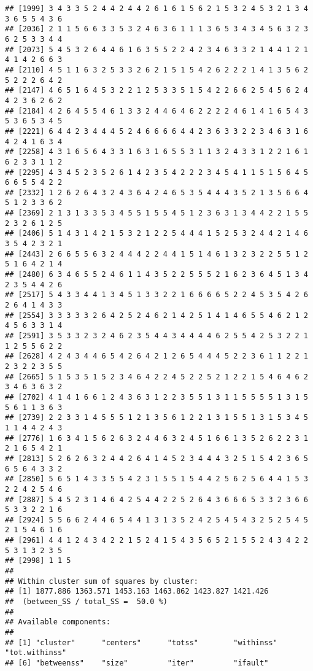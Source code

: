 \documentclass[
]{article}
\begin{document}
\begin{verbatim}
## [1999] 3 4 3 3 5 2 4 4 2 4 4 2 6 1 6 1 5 6 2 1 5 3 2 4 5 3 2 1 3 4 3 6 5 5 4 3 6
## [2036] 2 1 1 5 6 6 3 3 5 3 2 4 6 3 6 1 1 1 3 6 5 3 4 3 4 5 6 3 2 3 6 2 5 3 3 4 4
## [2073] 5 4 5 3 2 6 4 4 6 1 6 3 5 5 2 2 4 2 3 4 6 3 3 2 1 4 4 1 2 1 4 1 4 2 6 6 3
## [2110] 4 5 1 1 6 3 2 5 3 3 2 6 2 1 5 1 5 4 2 6 2 2 2 1 4 1 3 5 6 2 5 2 2 2 6 4 2
## [2147] 4 6 5 1 6 4 5 3 2 2 1 2 5 3 3 5 1 5 4 2 2 6 6 2 5 4 5 6 2 4 4 2 3 6 2 6 2
## [2184] 4 2 6 4 5 5 4 6 1 3 3 2 4 4 6 4 6 2 2 2 2 4 6 1 4 1 6 5 4 3 5 3 6 5 3 4 5
## [2221] 6 4 4 2 3 4 4 4 5 2 4 6 6 6 6 4 4 2 3 6 3 3 2 2 3 4 6 3 1 6 4 2 4 1 6 3 4
## [2258] 4 3 1 6 5 6 4 3 3 1 6 3 1 6 5 5 3 1 1 3 2 4 3 3 1 2 2 1 6 1 6 2 3 3 1 1 2
## [2295] 4 3 4 5 2 3 5 2 6 1 4 2 3 5 4 2 2 2 3 4 5 4 1 1 5 1 5 6 4 5 6 6 5 5 4 2 2
## [2332] 1 2 6 2 6 4 3 2 4 3 6 4 2 4 6 5 3 5 4 4 4 3 5 2 1 3 5 6 6 4 5 1 2 3 3 6 2
## [2369] 2 1 3 1 3 3 5 3 4 5 5 1 5 5 4 5 1 2 3 6 3 1 3 4 4 2 2 1 5 5 2 3 2 6 1 2 5
## [2406] 5 1 4 3 1 4 2 1 5 3 2 1 2 2 5 4 4 4 1 5 2 5 3 2 4 4 2 1 4 6 3 5 4 2 3 2 1
## [2443] 2 6 6 5 5 6 3 2 4 4 4 2 2 4 4 1 5 1 4 6 1 3 2 3 2 2 5 5 1 2 5 1 6 4 2 1 4
## [2480] 6 3 4 6 5 5 2 4 6 1 1 4 3 5 2 2 5 5 5 2 1 6 2 3 6 4 5 1 3 4 2 3 5 4 4 2 6
## [2517] 5 4 3 3 4 4 1 3 4 5 1 3 3 2 2 1 6 6 6 6 5 2 2 4 5 3 5 4 2 6 2 6 4 1 4 3 3
## [2554] 3 3 3 3 3 2 6 4 2 5 2 4 6 2 1 4 2 5 1 4 1 4 6 5 5 4 6 2 1 2 4 5 6 3 3 1 4
## [2591] 3 5 3 3 2 3 2 4 6 2 3 5 4 4 3 4 4 4 4 6 2 5 5 4 2 5 3 2 2 1 1 2 5 5 6 2 2
## [2628] 4 2 4 3 4 4 6 5 4 2 6 4 2 1 2 6 5 4 4 4 5 2 2 3 6 1 1 2 2 1 2 3 2 2 3 5 5
## [2665] 5 1 5 3 5 1 5 2 3 4 6 4 2 2 4 5 2 2 5 2 1 2 2 1 5 4 6 4 6 2 3 4 6 3 6 3 2
## [2702] 4 1 4 1 6 6 1 2 4 3 6 3 1 2 2 3 5 5 1 3 1 1 5 5 5 5 1 3 1 5 5 6 1 1 3 6 3
## [2739] 2 2 3 3 1 4 5 5 5 1 2 1 3 5 6 1 2 2 1 3 1 5 5 1 3 1 5 3 4 5 1 1 4 4 2 4 3
## [2776] 1 6 3 4 1 5 6 2 6 3 2 4 4 6 3 2 4 5 1 6 6 1 3 5 2 6 2 2 3 1 2 1 6 5 4 2 1
## [2813] 5 2 6 2 6 3 2 4 4 2 6 4 1 4 5 2 3 4 4 4 3 2 5 1 5 4 2 3 6 5 6 5 6 4 3 3 2
## [2850] 5 6 5 1 4 3 3 5 5 4 2 3 1 5 5 1 5 4 4 2 5 6 2 5 6 4 4 1 5 3 2 2 4 2 5 4 6
## [2887] 5 4 5 2 3 1 4 6 4 2 5 4 4 2 2 5 2 6 4 3 6 6 6 5 3 3 2 3 6 6 5 3 3 2 2 1 6
## [2924] 5 5 6 6 2 4 4 6 5 4 4 1 3 1 3 5 2 4 2 5 4 5 4 3 2 5 2 5 4 5 2 1 5 4 6 1 6
## [2961] 4 4 1 2 4 3 4 2 2 1 5 2 4 1 5 4 3 5 6 5 2 1 5 5 2 4 3 4 2 2 5 3 1 3 2 3 5
## [2998] 1 1 5
## 
## Within cluster sum of squares by cluster:
## [1] 1877.886 1363.571 1453.163 1463.862 1423.827 1421.426
##  (between_SS / total_SS =  50.0 %)
## 
## Available components:
## 
## [1] "cluster"      "centers"      "totss"        "withinss"     "tot.withinss"
## [6] "betweenss"    "size"         "iter"         "ifault"
\end{verbatim}
\end{document}
